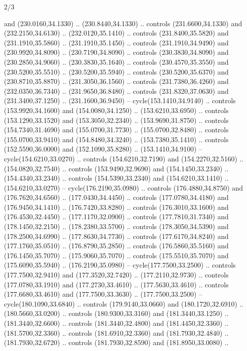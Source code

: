 \begin{flagdescription}{2/3}
\begin{scope}[xshift=0.5\flaglength,yshift=0.5\flagwidth,scale=\stretchfactor]
\begin{scope}[scale=0.001645\flagwidth,yshift=65mm,xshift=-63mm]
\begin{scope}[y=0.80pt, x=0.80pt, yscale=-1,]
\begin{scope}[cm={{1.33333,0.0,0.0,1.33333,(0.0,1e-05)}}]
  and (230.0160,34.1330) .. (230.8440,34.1330) .. controls (231.6600,34.1330)
  and (232.2150,34.6130) .. (232.0120,35.1410) .. controls (231.8400,35.5820)
  and (231.1910,35.5860) .. (231.1910,35.1450) .. controls (231.1910,34.9490)
  and (230.9920,34.8090) .. (230.7190,34.8090) .. controls (230.3830,34.8090)
  and (230.2850,34.9060) .. (230.3830,35.1640) .. controls (230.4570,35.3550)
  and (230.5200,35.5510) .. (230.5200,35.5940) .. controls (230.5200,35.6370)
  and (230.8710,35.8870) .. (231.3050,36.1560) .. controls (231.7380,36.4260)
  and (232.0350,36.7340) .. (231.9650,36.8480) .. controls (231.8320,37.0630)
  and (231.3400,37.1250) .. (231.1600,36.9450) -- cycle(153.1410,34.9140) ..
  controls (153.9920,34.1600) and (154.0080,34.1250) .. (153.6210,33.6950) ..
  controls (153.1290,33.1520) and (153.3050,32.2340) .. (153.9690,31.8750) ..
  controls (154.7340,31.4690) and (155.0700,31.7730) .. (155.0700,32.8480) ..
  controls (155.0700,33.9410) and (154.8480,34.3240) .. (153.7380,35.1410) ..
  controls (152.5590,36.0000) and (152.1090,35.8280) .. (153.1410,34.9100) --
  cycle(154.6210,33.0270) .. controls (154.6210,32.7190) and (154.2270,32.5160)
  .. (154.0820,32.7540) .. controls (153.9490,32.9690) and (154.1450,33.2340) ..
  (154.4340,33.2340) .. controls (154.5390,33.2340) and (154.6210,33.1410) ..
  (154.6210,33.0270) -- cycle(176.2190,35.0980) .. controls (176.4880,34.8750)
  and (176.7620,34.6560) .. (177.0430,34.4450) .. controls (177.0780,34.4180)
  and (176.9450,34.1410) .. (176.7420,33.8280) .. controls (176.3010,33.1600)
  and (176.4530,32.4450) .. (177.1170,32.0900) .. controls (177.7810,31.7340)
  and (178.1450,32.2150) .. (178.2380,33.5700) .. controls (178.3050,34.5390)
  and (178.2500,34.6990) .. (177.8630,34.7730) .. controls (177.6170,34.8240)
  and (177.1760,35.0510) .. (176.8790,35.2850) .. controls (176.5860,35.5160)
  and (176.1450,35.7070) .. (175.9060,35.7070) .. controls (175.5510,35.7070)
  and (175.6090,35.5940) .. (176.2190,35.0980) -- cycle(177.7500,33.2500) ..
  controls (177.7500,32.9410) and (177.3520,32.7420) .. (177.2110,32.9730) ..
  controls (177.0780,33.1910) and (177.2730,33.4610) .. (177.5630,33.4610) ..
  controls (177.6680,33.4610) and (177.7500,33.3630) .. (177.7500,33.2500) --
  cycle(180.1090,33.6840) .. controls (179.9140,33.0660) and (180.1720,32.6910)
  .. (180.5660,33.0200) .. controls (180.9300,33.3160) and (181.3440,33.1250) ..
  (181.3440,32.6600) .. controls (181.3440,32.4800) and (181.4450,32.3360) ..
  (181.5700,32.3360) .. controls (181.6910,32.3360) and (181.7930,32.4840) ..
  (181.7930,32.6720) .. controls (181.7930,32.8590) and (181.8950,33.0080) ..

\end{scope}
\end{scope}
\end{scope}
\end{scope}
\end{flagdescription}
